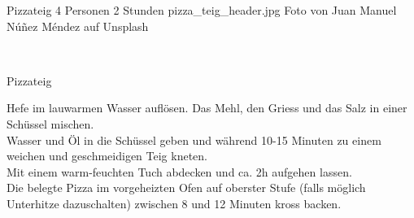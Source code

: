 \begin{myrecipe}
    {Pizzateig}
    {4 Personen}
    {2 Stunden}
    {pizza_teig_header.jpg}
    {Foto von Juan Manuel Núñez Méndez auf Unsplash}

    \freeform
    \newpage

    \freeform
    \mbox{}\\[-\baselineskip]%
    \parbox[b]{\textwidth}{%
    \rule{0pt}{\baselineskip}%
    \strut{\recipetitlefont Pizzateig}\strut\hfill}%
    
    Hefe im lauwarmen Wasser auflösen. Das Mehl, den Griess und das Salz in einer Schüssel mischen.
    \\Wasser und Öl in die Schüssel geben und während 10-15 Minuten zu einem weichen und geschmeidigen Teig kneten.
    \freeform
    \\Mit einem warm-feuchten Tuch abdecken und ca. 2h aufgehen lassen.
    \freeform
    \\Die belegte Pizza im vorgeheizten Ofen auf oberster Stufe (falls möglich Unterhitze dazuschalten) zwischen 8 und 12 Minuten kross backen.
    \freeform
\end{myrecipe}
\clearpage